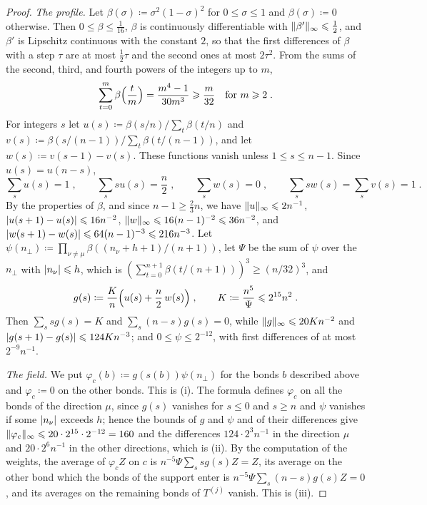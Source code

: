 \documentclass[11pt]{preprint}
\DeclarePairedDelimiter{\abs}{\lvert}{\rvert}
\DeclarePairedDelimiter{\norm}{\lVert}{\rVert}
\numberwithin{equation}{section}
\begin{document}
\begin{proof}
\emph{The profile.} Let $\beta(\sigma) \coloneqq \sigma^2(1 - \sigma)^2$ for $0 \leqslant \sigma \leqslant 1$ and $\beta(\sigma) \coloneqq 0$ otherwise. Then $0 \leqslant \beta \leqslant \frac{1}{16}$, $\beta$ is continuously differentiable with $\norm{\beta'}_\infty \leqslant \frac{1}{2}$, and $\beta'$ is Lipschitz continuous with the constant $2$, so that the first differences of $\beta$ with a step $\tau$ are at most $\frac{1}{2}\tau$ and the second ones at most $2\tau^2$. From the sums of the second, third, and fourth powers of the integers up to $m$,
\[
    \sum_{t=0}^{m}\beta\Bigl(\frac{t}{m}\Bigr) = \frac{m^4 - 1}{30m^3} \geqslant \frac{m}{32} \quad\text{for } m \geqslant 2\;.
\]
For integers $s$ let $u(s) \coloneqq \beta(s/n)/\sum_t\beta(t/n)$ and $v(s) \coloneqq \beta(s/(n - 1))/\sum_t\beta(t/(n - 1))$, and let $w(s) \coloneqq v(s - 1) - v(s)$. These functions vanish unless $1 \leqslant s \leqslant n - 1$. Since $u(s) = u(n - s)$,
\[
    \sum_su(s) = 1\;,
    \qquad
    \sum_ssu(s) = \frac{n}{2}\;,
    \qquad
    \sum_sw(s) = 0\;,
    \qquad
    \sum_ssw(s) = \sum_sv(s) = 1\;.
\]
By the properties of $\beta$, and since $n - 1 \geqslant \frac{2}{3}n$, we have $\norm u_\infty \leqslant 2n^{-1}$, $\abs{u(s + 1) - u(s)} \leqslant 16n^{-2}$, $\norm w_\infty \leqslant 16(n - 1)^{-2} \leqslant 36n^{-2}$, and $\abs{w(s + 1) - w(s)} \leqslant 64(n - 1)^{-3} \leqslant 216n^{-3}$. Let $\psi(n_\perp) \coloneqq \prod_{\nu \neq \mu}\beta((n_\nu + h + 1)/(n + 1))$, let $\Psi$ be the sum of $\psi$ over the $n_\perp$ with $\abs{n_\nu} \leqslant h$, which is $(\sum_{t=0}^{n+1}\beta(t/(n + 1)))^3 \geqslant (n/32)^3$, and
\[
    g(s) \coloneqq \frac{K}{n}\Bigl(u(s) + \frac{n}{2}\,w(s)\Bigr)\;,
    \qquad
    K \coloneqq \frac{n^5}{\Psi} \leqslant 2^{15}n^2\;.
\]
Then $\sum_ssg(s) = K$ and $\sum_s(n - s)g(s) = 0$, while $\norm g_\infty \leqslant 20Kn^{-2}$ and $\abs{g(s + 1) - g(s)} \leqslant 124Kn^{-3}$; and $0 \leqslant \psi \leqslant 2^{-12}$, with first differences of at most $2^{-9}n^{-1}$.

\emph{The field.} We put $\varphi_c(b) \coloneqq g(s(b))\psi(n_\perp)$ for the bonds $b$ described above and $\varphi_c \coloneqq 0$ on the other bonds. This is (i). The formula defines $\varphi_c$ on all the bonds of the direction $\mu$, since $g(s)$ vanishes for $s \leqslant 0$ and $s \geqslant n$ and $\psi$ vanishes if some $\abs{n_\nu}$ exceeds $h$; hence the bounds of $g$ and $\psi$ and of their differences give $\norm{\varphi_c}_\infty \leqslant 20 \cdot 2^{15} \cdot 2^{-12} = 160$ and the differences $124 \cdot 2^3n^{-1}$ in the direction $\mu$ and $20 \cdot 2^6n^{-1}$ in the other directions, which is (ii). By the computation of the weights, the average of $\varphi_cZ$ on $c$ is $n^{-5}\Psi\sum_ssg(s)Z = Z$, its average on the other bond which the bonds of the support enter is $n^{-5}\Psi\sum_s(n - s)g(s)Z = 0$, and its averages on the remaining bonds of $T^{(j)}$ vanish. This is (iii).
\end{proof}
\end{document}
